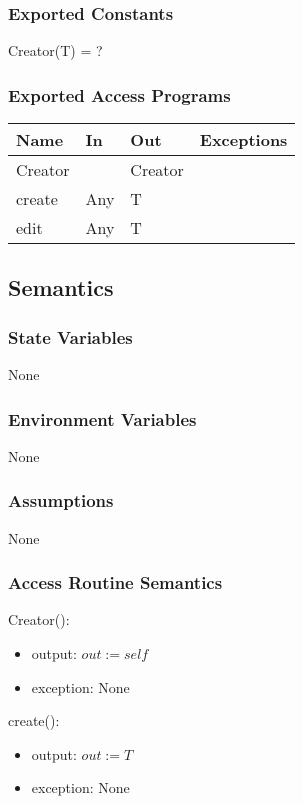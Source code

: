 \documentclass[12pt, titlepage]{article}
\begin{document}
\subsubsection{Exported Constants}
Creator(T) = ?
\subsubsection{Exported Access Programs}

\begin{center}
	\begin{tabular}{p{2cm} p{4cm} p{4cm} p{2cm}}
		\hline
		\textbf{Name} & \textbf{In} & \textbf{Out} & \textbf{Exceptions} \\
		\hline
		Creator &  & Creator &  \\
		create & Any & T &  \\
		edit & Any & T &  \\
		\hline
	\end{tabular}
\end{center}

\subsection{Semantics}

\subsubsection{State Variables}
None

\subsubsection{Environment Variables}
None
\subsubsection{Assumptions}
None
\subsubsection{Access Routine Semantics}

\noindent Creator():
\begin{itemize}
	\item output: $out := self$
	\item exception: None
\end{itemize}

\noindent create():
\begin{itemize}
	\item output: $out := T$
	\item exception: None
\end{itemize}
\end{document}
